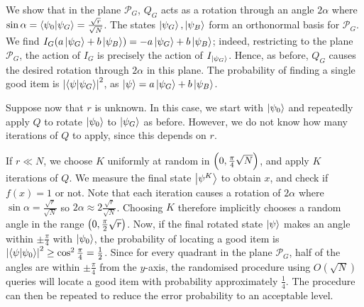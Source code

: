 We show that in the plane \( \mathcal P_G \), \( Q_G \) acts as a rotation through an angle \( 2\alpha \) where \( \sin \alpha = \ip{\psi_0}{\psi_G} = \frac{\sqrt{r}}{\sqrt{N}} \).
The states \( \ket{\psi_G}, \ket{\psi_B} \) form an orthonormal basis for \( \mathcal P_G \).
We find \( I_G (a \ket{\psi_G} + b \ket{\psi_B}) = -a \ket{\psi_G} + b \ket{\psi_B} \); indeed, restricting to the plane \( \mathcal P_G \), the action of \( I_G \) is precisely the action of \( I_{\ket{\psi_G}} \).
Hence, as before, \( Q_G \) causes the desired rotation through \( 2\alpha \) in this plane.
The probability of finding a single good item is \( \abs{\ip{\psi}{\psi_G}}^2 \), as \( \ket{\psi} = a \ket{\psi_G} + b \ket{\psi_B} \).

Suppose now that \( r \) is unknown.
In this case, we start with \( \ket{\psi_0} \) and repeatedly apply \( Q \) to rotate \( \ket{\psi_0} \) to \( \ket{\psi_G} \) as before.
However, we do not know how many iterations of \( Q \) to apply, since this depends on \( r \).

If \( r \ll N \), we choose \( K \) uniformly at random in \( \qty(0, \frac{\pi}{4}\sqrt{N}) \), and apply \( K \) iterations of \( Q \).
We measure the final state \( \ket{\psi^K} \) to obtain \( x \), and check if \( f(x) = 1 \) or not.
Note that each iteration causes a rotation of \( 2\alpha \) where \( \sin \alpha = \frac{\sqrt{r}}{\sqrt{N}} \) so \( 2\alpha \approx 2\frac{\sqrt{r}}{\sqrt{N}} \).
Choosing \( K \) therefore implicitly chooses a random angle in the range \( \qty(0, \frac{\pi}{2} \sqrt{r}) \).
Now, if the final rotated state \( \ket{\psi} \) makes an angle within \( \pm \frac{\pi}{4} \) with \( \ket{\psi_0} \), the probability of locating a good item is \( \abs{\ip{\psi}{\psi_0}}^2 \geq \cos^2 \frac{\pi}{4} = \frac{1}{2} \).
Since for every quadrant in the plane \( \mathcal P_G \), half of the angles are within \( \pm \frac{\pi}{4} \) from the \( y \)-axis, the randomised procedure using \( O(\sqrt{N}) \) queries will locate a good item with probability approximately \( \frac{1}{4} \).
The procedure can then be repeated to reduce the error probability to an acceptable level.

